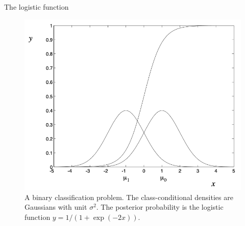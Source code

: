 \documentclass{beamer}
\begin{document}
\begin{frame}{The logistic function}
    \begin{figure}
        \includegraphics[width=0.6\linewidth]{logistic}
        \caption{A binary classification problem. The class-conditional densities are Gaussians with unit $\sigma^2$. The posterior probability is the logistic function $y=1/(1+\exp{(-2x)})$\cite{jordan_why_1995}.}
        \label{Fig:logistic}
    \end{figure}
\end{frame}
\end{document}
